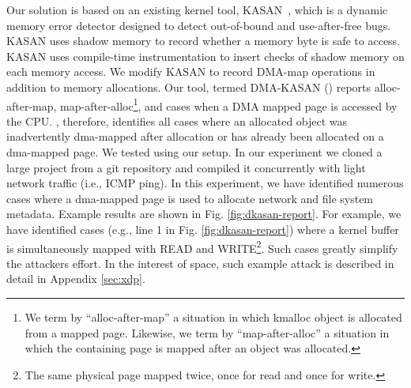 Our solution is based on an existing kernel tool, KASAN~\cite{kasan}, which is a dynamic memory error detector designed to detect out-of-bound and use-after-free bugs. KASAN uses shadow memory to record whether a memory byte is safe to access. KASAN uses compile-time instrumentation to insert checks of shadow memory on each memory access. 
We modify KASAN to record DMA-map operations in addition to memory allocations. Our tool, termed DMA-KASAN (\dkasan) reports alloc-after-map, map-after-alloc\footnote{We term by ``alloc-after-map'' a situation in which kmalloc object is allocated from a mapped page. Likewise, we term by ``map-after-alloc'' a situation in which the containing page is mapped after an object was allocated.}, and cases when a DMA mapped page is accessed by the CPU. \dkasan, therefore, identifies all cases where an allocated object was inadvertently dma-mapped after allocation or has already been allocated on a dma-mapped page. We tested \dkasan using our setup. In our experiment we cloned a large project from a git repository and compiled it concurrently with light network traffic (i.e., ICMP ping). In this experiment, we have identified numerous cases where a dma-mapped page is used to allocate network and file system metadata. Example results are shown in Fig. \ref{fig:dkasan-report}. 
For example, we have identified cases (e.g., line 1 in Fig. \ref{fig:dkasan-report}) where a kernel buffer is simultaneously mapped with READ and WRITE\footnote{The same physical page mapped twice, once for read and once for write.}. Such cases greatly simplify the attackers effort. In the interest of space, such example attack is described in detail in Appendix \ref{sec:xdp}. 
%
